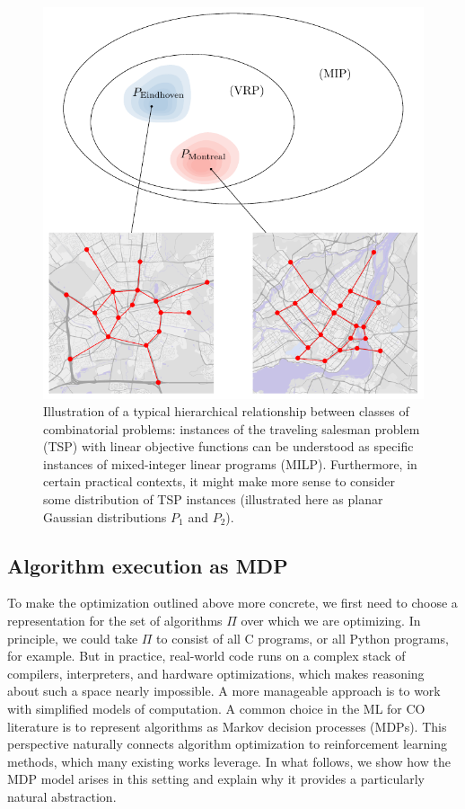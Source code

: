 \documentclass[a4paper]{report}
\theoremstyle{definition}
\theoremstyle{plain}
\begin{document}
\begin{figure}
  \centering
  \includegraphics[scale=1]{figures/problem-distribution.pdf}
  \caption{Illustration of a typical hierarchical relationship between classes
    of combinatorial problems: instances of the traveling salesman problem (TSP)
    with linear objective functions can be understood as specific instances of
    mixed-integer linear programs (MILP). Furthermore, in certain practical
    contexts, it might make more sense to consider some distribution of TSP
    instances (illustrated here as planar Gaussian distributions $P_1$ and
    $P_2$).}\label{fig:problem-distribution}
\end{figure}

\subsection{Algorithm execution as MDP}

To make the optimization outlined above more concrete, we first need to choose a
representation for the set of algorithms $\Pi$ over which we are
optimizing. In principle, we could take $\Pi$ to consist of all C
programs, or all Python programs, for example. But in practice, real-world code
runs on a complex stack of compilers, interpreters, and hardware optimizations,
which makes reasoning about such a space nearly impossible. A more manageable
approach is to work with simplified models of computation. A common choice in
the ML for CO literature is to represent algorithms as Markov decision processes
(MDPs). This perspective naturally connects algorithm optimization to
reinforcement learning methods, which many existing works leverage. In what
follows, we show how the MDP model arises in this setting and explain why it
provides a particularly natural abstraction.
\end{document}
